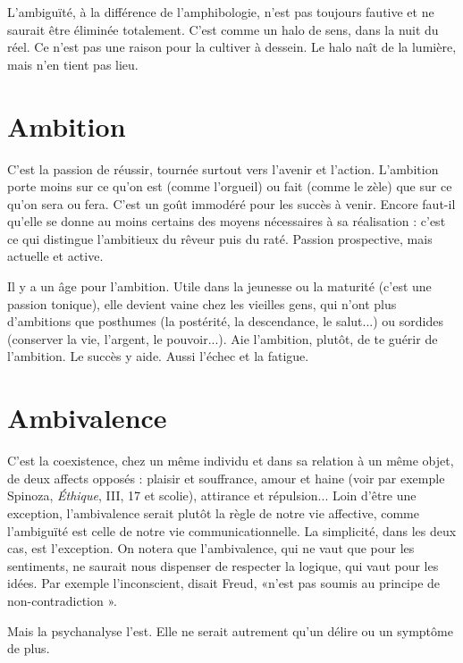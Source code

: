 L’ambiguïté, à la différence de l’amphibologie, n’est pas toujours fautive et
ne saurait être éliminée totalement. C’est comme un halo de sens, dans la nuit
du réel. Ce n’est pas une raison pour la cultiver à dessein. Le halo naît de la
lumière, mais n’en tient pas lieu.

\section{Ambition}
C'est la passion de réussir, tournée surtout vers l’avenir et l’action.
L’ambition porte moins sur ce qu’on est (comme l’orgueil) ou fait (comme
le zèle) que sur ce qu’on sera ou fera. C’est un goût immodéré pour les succès
à venir. Encore faut-il qu’elle se donne au moins certains des moyens nécessaires
à sa réalisation : c’est ce qui distingue l’ambitieux du rêveur puis du raté.
Passion prospective, mais actuelle et active.

Il y a un âge pour l’ambition. Utile dans la jeunesse ou la maturité (c’est
une passion tonique), elle devient vaine chez les vieilles gens, qui n’ont plus
d’ambitions que posthumes (la postérité, la descendance, le salut...) ou sordides
(conserver la vie, l'argent, le pouvoir...). Aie l'ambition, plutôt, de te
guérir de l’ambition. Le succès y aide. Aussi l’échec et la fatigue.

\section{Ambivalence}
C'est la coexistence, chez un même individu et dans sa relation
à un même objet, de deux affects opposés : plaisir et
souffrance, amour et haine (voir par exemple Spinoza, {\it Éthique}, III, 17 et
scolie), attirance et répulsion... Loin d’être une exception, l’ambivalence serait
plutôt la règle de notre vie affective, comme l'ambiguïté est celle de notre vie
communicationnelle. La simplicité, dans les deux cas, est l’exception.
On notera que l’ambivalence, qui ne vaut que pour les sentiments, ne saurait
nous dispenser de respecter la logique, qui vaut pour les idées. Par exemple
l'inconscient, disait Freud, «n’est pas soumis au principe de non-contradiction ».

Mais la psychanalyse l’est. Elle ne serait autrement qu’un délire ou
un symptôme de plus.

